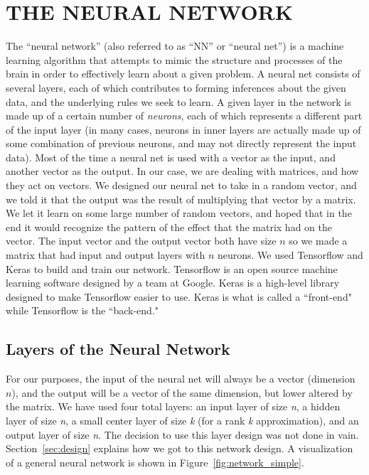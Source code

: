 \documentclass[a4paper,twoside]{article}
\begin{document}
\section{\uppercase{The Neural Network}}
\label{sec:nn}
\noindent The “neural network” (also referred to as “NN” or “neural net”) is a machine learning algorithm that attempts to mimic the structure and processes of the brain in order to effectively learn about a given problem. A neural net consists of several layers, each of which contributes to forming inferences about the given data, and the underlying rules we seek to learn. A given layer in the network is made up of a certain number of \textit{neurons}, each of which represents a different part of the input layer (in many cases, neurons in inner layers are actually made up of some combination of previous neurons, and may not directly represent the input data). Most of the time a neural net is used with a vector as the input, and another vector as the output. In our case, we are dealing with matrices, and how they act on vectors. We designed our neural net to take in a random vector, and we told it that the output was the result of multiplying that vector by a matrix. We let it learn on some large number of random vectors, and hoped that in the end it would recognize the pattern of the effect that the matrix had on the vector. The input vector and the output vector both have size $n$ so we made a matrix that had input and output layers with $n$ neurons. We used Tensorflow and Keras to build and train our network. Tensorflow is an open source machine learning software designed by a team at Google. Keras is a high-level library designed to make Tensorflow easier to use. Keras is what is called a ``front-end" while Tensorflow is the ``back-end."

\subsection{Layers of the Neural Network}
\noindent  For our purposes, the input of the neural net will always be a vector (dimension $n$), and the output will be a vector of the same dimension, but lower altered by the matrix. We have used four total layers: an input layer of size \textit{n}, a hidden layer of size \textit{n}, a small center layer of size \textit{k} (for a rank \textit{k} approximation), and an output layer of size \textit{n}. The decision to use this layer design was not done in vain. Section~\ref{sec:design} explains how we got to this network design. A visualization of a general neural network is shown in Figure~\ref{fig:network_simple}.
\end{document}

